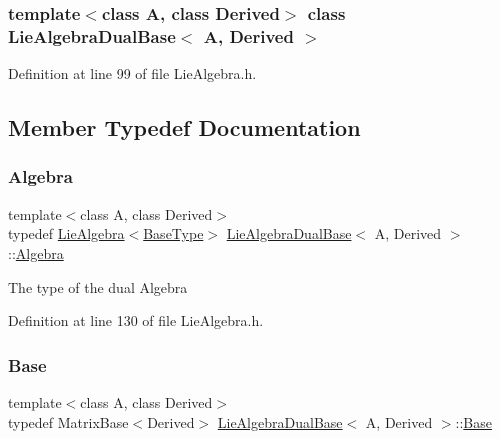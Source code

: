 \subsubsection*{template$<$class A, class Derived$>$\newline
class Lie\+Algebra\+Dual\+Base$<$ A, Derived $>$}



Definition at line 99 of file Lie\+Algebra.\+h.



\subsection{Member Typedef Documentation}
\hypertarget{class_lie_algebra_dual_base_a50d4fa9e6b80c63c7ec5955717133db3}{}\label{class_lie_algebra_dual_base_a50d4fa9e6b80c63c7ec5955717133db3} 
\subsubsection{\texorpdfstring{Algebra}{Algebra}}
{\footnotesize\ttfamily template$<$class A, class Derived$>$ \\
typedef \hyperlink{class_lie_algebra}{Lie\+Algebra}$<$\hyperlink{class_lie_algebra_dual_base_a1d0d10f7479bc0e235b13e29f1c012d2}{Base\+Type}$>$ \hyperlink{class_lie_algebra_dual_base}{Lie\+Algebra\+Dual\+Base}$<$ A, Derived $>$\+::\hyperlink{class_lie_algebra_dual_base_a50d4fa9e6b80c63c7ec5955717133db3}{Algebra}}

The type of the dual Algebra 

Definition at line 130 of file Lie\+Algebra.\+h.

\hypertarget{class_lie_algebra_dual_base_aefad5adecf2973bcc85a83015c111faf}{}\label{class_lie_algebra_dual_base_aefad5adecf2973bcc85a83015c111faf} 
\subsubsection{\texorpdfstring{Base}{Base}}
{\footnotesize\ttfamily template$<$class A, class Derived$>$ \\
typedef Matrix\+Base$<$Derived$>$ \hyperlink{class_lie_algebra_dual_base}{Lie\+Algebra\+Dual\+Base}$<$ A, Derived $>$\+::\hyperlink{class_lie_algebra_dual_base_aefad5adecf2973bcc85a83015c111faf}{Base}\hspace{0.3cm}{\ttfamily [protected]}}

